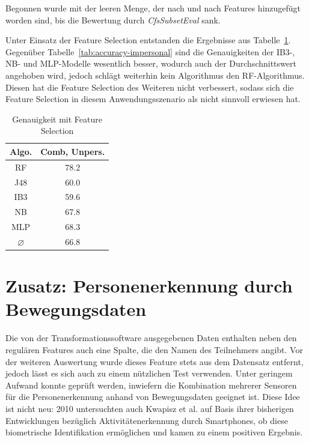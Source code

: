 Begonnen wurde mit der leeren Menge, der nach und nach Features hinzugefügt worden sind, bis die Bewertung durch \textit{CfsSubsetEval} sank.

Unter Einsatz der Feature Selection entstanden die Ergebnisse aus Tabelle~\ref{tab:accuracy-feature-selection}. Gegenüber Tabelle~\ref{tab:accuracy-impersonal} sind die Genauigkeiten der IB3-, NB- und MLP-Modelle wesentlich besser, wodurch auch der Durchschnittswert angehoben wird, jedoch schlägt weiterhin kein Algorithmus den RF-Algorithmus. Diesen hat die Feature Selection des Weiteren nicht verbessert, sodass sich die Feature Selection in diesem Anwendungsszenario als nicht sinnvoll erwiesen hat.

\begin{table}
\centering
\begin{tabular}{|c|c|}
	\hline 
	\textbf{Algo.} & \textbf{Comb, Unpers.} \\ 
	\hline 
	RF & 78.2 \\ 
	J48 & 60.0 \\ 
	IB3 & 59.6 \\ 
	NB & 67.8 \\ 
	MLP & 68.3 \\ 
	\hline 
	$\varnothing$ & 66.8 \\ 
	\hline 
\end{tabular}
\caption{Genauigkeit mit Feature Selection}
\label{tab:accuracy-feature-selection}
\end{table}

\section{Zusatz: Personenerkennung durch Bewegungsdaten}
Die von der Transformationssoftware ausgegebenen Daten enthalten neben den regulären Features auch eine Spalte, die den Namen des Teilnehmers angibt. Vor der weiteren Auswertung wurde dieses Feature stets aus dem Datensatz entfernt, jedoch lässt es sich auch zu einem nützlichen Test verwenden. Unter geringem Aufwand konnte geprüft werden, inwiefern die Kombination mehrerer Sensoren für die Personenerkennung anhand von Bewegungsdaten geeignet ist. Diese Idee ist nicht neu: 2010 untersuchten auch Kwapisz et al. auf Basis ihrer bisherigen Entwicklungen bezüglich Aktivitätenerkennung durch Smartphones, ob diese biometrische Identifikation ermöglichen \cite{Kwapisz2010} und kamen zu einem positiven Ergebnis.

